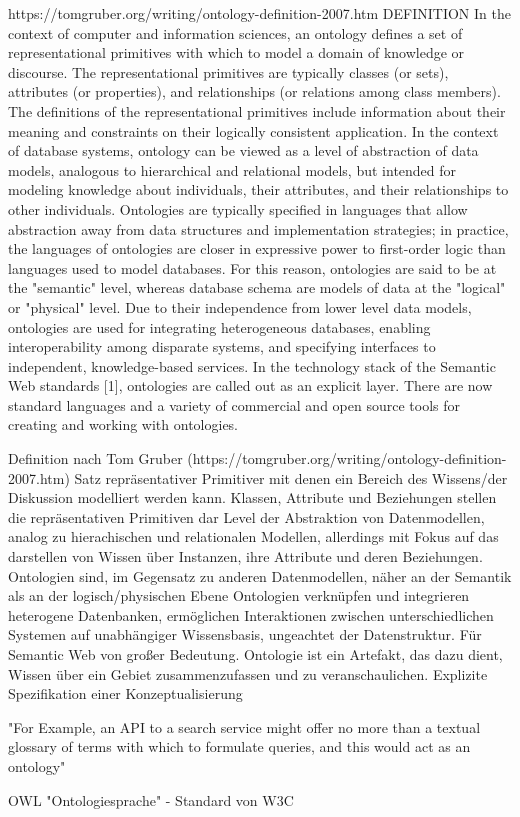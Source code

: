 	
	https://tomgruber.org/writing/ontology-definition-2007.htm
	DEFINITION
	In the context of computer and information sciences, an ontology defines a set of representational primitives with which to model a domain of knowledge or discourse.  The representational primitives are typically classes (or sets), attributes (or properties), and relationships (or relations among class members).  The definitions of the representational primitives include information about their meaning and constraints on their logically consistent application.  In the context of database systems, ontology can be viewed as a level of abstraction of data models, analogous to hierarchical and relational models, but intended for modeling knowledge about individuals, their attributes, and their relationships to other individuals.  Ontologies are typically specified in languages that allow abstraction away from data structures and implementation strategies; in practice, the languages of ontologies are closer in expressive power to first-order logic than languages used to model databases.  For this reason, ontologies are said to be at the "semantic" level, whereas database schema are models of data at the "logical" or "physical" level.  Due to their independence from lower level data models, ontologies are used for integrating heterogeneous databases, enabling interoperability among disparate systems, and specifying interfaces to independent, knowledge-based services.  In the technology stack of the Semantic Web standards [1], ontologies are called out as an explicit layer.  There are now standard languages and a variety of commercial and open source tools for creating and working with ontologies.

Definition nach Tom Gruber (https://tomgruber.org/writing/ontology-definition-2007.htm)
	Satz repräsentativer Primitiver mit denen ein Bereich des Wissens/der Diskussion modelliert werden kann.
	Klassen, Attribute und Beziehungen stellen die repräsentativen Primitiven dar
	Level der Abstraktion von Datenmodellen, analog zu hierachischen und relationalen Modellen, allerdings mit Fokus auf das darstellen von Wissen über Instanzen, ihre Attribute und deren Beziehungen.
	Ontologien sind, im Gegensatz zu anderen Datenmodellen, näher an der Semantik als an der logisch/physischen Ebene
	Ontologien verknüpfen und integrieren heterogene Datenbanken, ermöglichen Interaktionen zwischen unterschiedlichen Systemen auf unabhängiger Wissensbasis, ungeachtet der Datenstruktur.
	Für Semantic Web von großer Bedeutung.
	Ontologie ist ein Artefakt, das dazu dient, Wissen über ein Gebiet zusammenzufassen und zu veranschaulichen.
	Explizite Spezifikation einer Konzeptualisierung
	
	"For Example, an API to a search service might offer no more than a textual glossary of terms with which to formulate queries, and this would act as an ontology"
	
	OWL "Ontologiesprache" - Standard von W3C
	